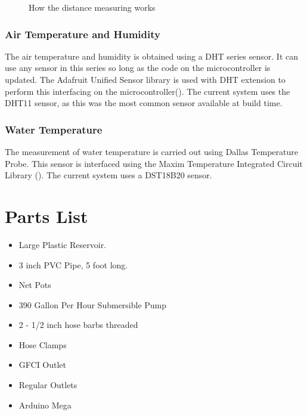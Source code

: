 \documentclass[american,man,12pt]{article}
\begin{document}
\begin{figure}[h]
	\centering
	\caption{How the distance measuring works}
	\label{fig:distance measuring}
\end{figure}

\subsubsection{Air Temperature and Humidity}
The air temperature and humidity is obtained using a DHT series sensor. It can
use any sensor in this series so long as the code on the microcontroller is
updated. The Adafruit Unified Sensor library is used with DHT extension to
perform this interfacing on the
microcontroller(\cite{adafruit-unified-sensor,adafruit-dht}). The current system
uses the DHT11 sensor, as this was the most common sensor available at build
time.

\subsubsection{Water Temperature}
The measurement of water temperature is carried out using Dallas Temperature
Probe. This sensor is interfaced using the Maxim Temperature Integrated Circuit
Library (\cite{gh-arduino-temperature}). The current system uses
a DST18B20 sensor.

\section{Parts List}
\begin{itemize}
	\item Large Plastic Reservoir.
	\item 3 inch PVC Pipe, 5 foot long.
	\item Net Pots
	\item 390 Gallon Per Hour Submersible Pump
    \item 2 - 1/2 inch hose barbs threaded
    \item Hose Clamps
    \item GFCI Outlet
    \item Regular Outlets
    \item Arduino Mega
\end{itemize}
\end{document}
